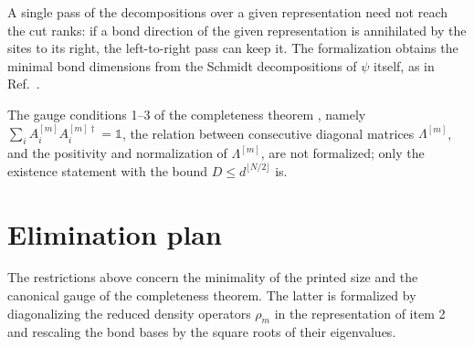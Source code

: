 \documentclass{article}
\begin{document}
A single pass of the decompositions over a given representation need not reach
the cut ranks: if a bond direction of the given representation is annihilated
by the sites to its right, the left-to-right pass can keep it. The
formalization obtains the minimal bond dimensions from the Schmidt
decompositions of $\psi$ itself, as in
Ref.~\cite[lines~444--447]{PerezGarcia2007Matrix}.

The gauge conditions 1--3 of the completeness theorem
\cite[lines~431--442]{PerezGarcia2007Matrix}, namely
$\sum_iA^{[m]}_iA^{[m]\dagger}_i=\mathbb 1$, the relation between consecutive
diagonal matrices $\Lambda^{[m]}$, and the positivity and normalization of
$\Lambda^{[m]}$, are not formalized; only the existence statement with the bound
$D\le d^{\lfloor N/2\rfloor}$ is.

\section{Elimination plan}

The restrictions above concern the minimality of the printed size and the canonical
gauge of the completeness theorem. The latter is formalized by diagonalizing
the reduced density operators $\rho_m$ in the representation of item 2 and
rescaling the bond bases by the square roots of their eigenvalues.



\end{document}
